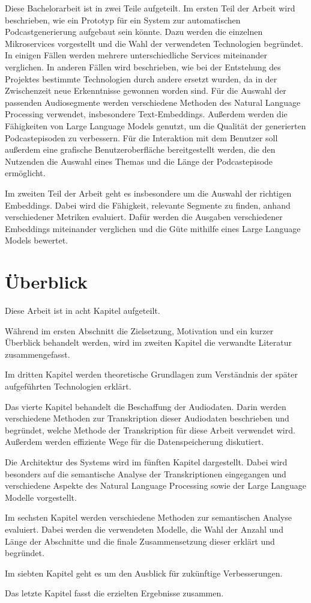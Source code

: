 Diese Bachelorarbeit ist in zwei Teile aufgeteilt.
Im ersten Teil der Arbeit wird beschrieben, wie ein Prototyp für ein System zur automatischen Podcastgenerierung aufgebaut sein könnte.
Dazu werden die einzelnen Mikroservices vorgestellt und die Wahl der verwendeten Technologien begründet.
In einigen Fällen werden mehrere unterschiedliche Services miteinander verglichen.
In anderen Fällen wird beschrieben, wie bei der Entstehung des Projektes bestimmte Technologien durch andere ersetzt wurden, da in der Zwischenzeit neue Erkenntnisse gewonnen worden sind.
Für die Auswahl der passenden Audiosegmente werden verschiedene Methoden des Natural Language Processing verwendet, insbesondere Text-Embeddings.
Außerdem werden die Fähigkeiten von Large Language Models genutzt, um die Qualität der generierten Podcastepisoden zu verbessern.
Für die Interaktion mit dem Benutzer soll außerdem eine grafische Benutzeroberfläche bereitgestellt werden, die den Nutzenden die Auswahl eines Themas und die Länge der Podcastepisode ermöglicht.

Im zweiten Teil der Arbeit geht es insbesondere um die Auswahl der richtigen Embeddings.
Dabei wird die Fähigkeit, relevante Segmente zu finden, anhand verschiedener Metriken evaluiert.
Dafür werden die Ausgaben verschiedener Embeddings miteinander verglichen und die Güte mithilfe eines Large Language Models bewertet.

\section{Überblick}

Diese Arbeit ist in acht Kapitel aufgeteilt.

Während im ersten Abschnitt die Zielsetzung, Motivation und ein kurzer Überblick behandelt werden, wird im zweiten Kapitel die verwandte Literatur zusammengefasst.

Im dritten Kapitel werden theoretische Grundlagen zum Verständnis der später aufgeführten Technologien erklärt.

Das vierte Kapitel behandelt die Beschaffung der Audiodaten.
Darin werden verschiedene Methoden zur Transkription dieser Audiodaten beschrieben und begründet, welche Methode der Transkription für diese Arbeit verwendet wird.
Außerdem werden effiziente Wege für die Datenspeicherung diskutiert.

Die Architektur des Systems wird im fünften Kapitel dargestellt.
Dabei wird besonders auf die semantische Analyse der Transkriptionen eingegangen und verschiedene Aspekte des Natural Language Processing sowie der Large Language Modelle vorgestellt.

Im sechsten Kapitel werden verschiedene Methoden zur semantischen Analyse evaluiert.
Dabei werden die verwendeten Modelle, die Wahl der Anzahl und Länge der Abschnitte und die finale Zusammensetzung dieser erklärt und begründet.

Im siebten Kapitel geht es um den Ausblick für zukünftige Verbesserungen.

Das letzte Kapitel fasst die erzielten Ergebnisse zusammen.
